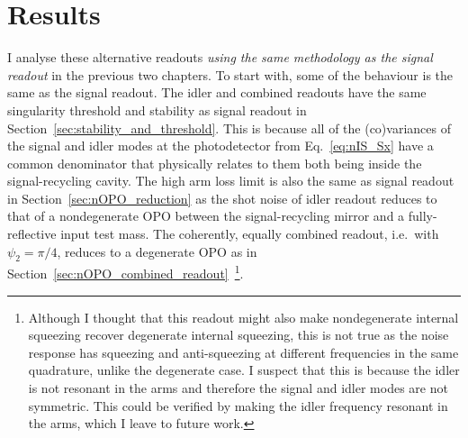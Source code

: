 \section{Results}
\label{sec:idlerRO_initial_results}

I analyse these alternative readouts \emph{using the same methodology as the signal readout} in the previous two chapters. 
To start with, some of the behaviour is the same as the signal readout. 
The idler and combined readouts have the same singularity threshold and stability as signal readout in Section~\ref{sec:stability_and_threshold}. This is because all of the (co)variances of the signal and idler modes at the photodetector from Eq.~\ref{eq:nIS_Sx} have a common denominator that physically relates to them both being inside the signal-recycling cavity. %
The high arm loss limit is also the same as signal readout in Section~\ref{sec:nOPO_reduction} as the shot noise of idler readout reduces to that of a nondegenerate OPO between the signal-recycling mirror and a fully-reflective input test mass. The coherently, equally combined readout, i.e.\ with $\psi_2=\pi/4$, reduces to a degenerate OPO as in Section~\ref{sec:nOPO_combined_readout}~\footnote{Although I thought that this readout might also make nondegenerate internal squeezing recover degenerate internal squeezing, this is not true as the noise response has squeezing and anti-squeezing at different frequencies in the same quadrature, unlike the degenerate case. I suspect that this is because the idler is not resonant in the arms and therefore the signal and idler modes are not symmetric. This could be verified by making the idler frequency resonant in the arms, which I leave to future work.}.
